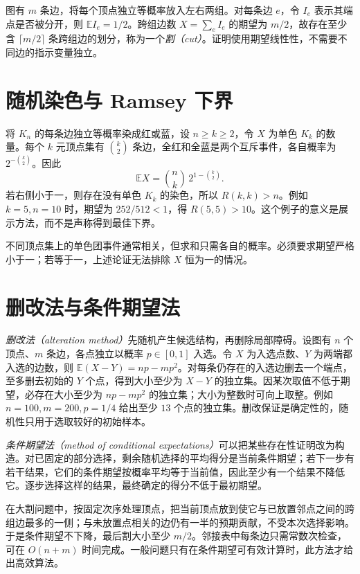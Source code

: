 \begin{example}[大割的存在]
图有 $m$ 条边，将每个顶点独立等概率放入左右两组。对每条边 $e$，令 $I_e$ 表示其端点是否被分开，则 $\mathbb E I_e=1/2$。跨组边数 $X=\sum_eI_e$ 的期望为 $m/2$，故存在至少含 $\lceil m/2\rceil$ 条跨组边的划分，称为一个\emph{割（cut）}。证明使用期望线性性，不需要不同边的指示变量独立。
\end{example}

\section{随机染色与 Ramsey 下界}

将 $K_n$ 的每条边独立等概率染成红或蓝，设 $n\ge k\ge2$，令 $X$ 为单色 $K_k$ 的数量。每个 $k$ 元顶点集有 $\binom k2$ 条边，全红和全蓝是两个互斥事件，各自概率为 $2^{-\binom k2}$。因此
\begin{equation}
 \mathbb E X=\binom nk\,2^{1-\binom k2}.
 \label{eq:ramsey-first-moment}
\end{equation}
若右侧小于一，则存在没有单色 $K_k$ 的染色，所以 $R(k,k)>n$。例如 $k=5,n=10$ 时，期望为 $252/512<1$，得 $R(5,5)>10$。这个例子的意义是展示方法，而不是声称得到最佳下界。

不同顶点集上的单色团事件通常相关，但求和只需各自的概率。必须要求期望严格小于一；若等于一，上述论证无法排除 $X$ 恒为一的情况。

\section{删改法与条件期望法}

\emph{删改法（alteration method）}先随机产生候选结构，再删除局部障碍。设图有 $n$ 个顶点、$m$ 条边，各点独立以概率 $p\in[0,1]$ 入选。令 $X$ 为入选点数、$Y$ 为两端都入选的边数，则 $\mathbb E(X-Y)=np-mp^2$。对每条仍存在的入选边删去一个端点，至多删去初始的 $Y$ 个点，得到大小至少为 $X-Y$ 的独立集。因某次取值不低于期望，必存在大小至少为 $np-mp^2$ 的独立集；大小为整数时可向上取整。例如 $n=100,m=200,p=1/4$ 给出至少 $13$ 个点的独立集。删改保证是确定性的，随机性只用于选取较好的初始样本。

\emph{条件期望法（method of conditional expectations）}可以把某些存在性证明改为构造。对已固定的部分选择，剩余随机选择的平均得分是当前条件期望；若下一步有若干结果，它们的条件期望按概率平均等于当前值，因此至少有一个结果不降低它。逐步选择这样的结果，最终确定的得分不低于最初期望。

在大割问题中，按固定次序处理顶点，把当前顶点放到使它与已放置邻点之间的跨组边最多的一侧；与未放置点相关的边仍有一半的预期贡献，不受本次选择影响。于是条件期望不下降，最后割大小至少 $m/2$。邻接表中每条边只需常数次检查，可在 $O(n+m)$ 时间完成。一般问题只有在条件期望可有效计算时，此方法才给出高效算法。

